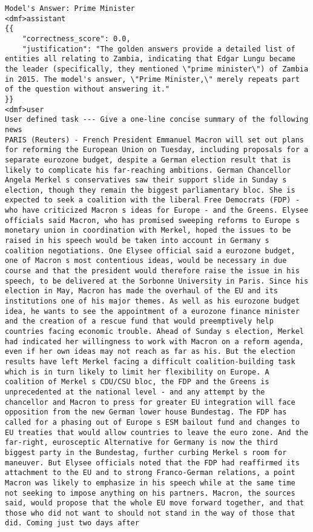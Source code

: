 \begin{tcolorbox}[
    title=Prompt format for the Llama 3.1 70b evaluator instruct LLM, label=prompt format, breakable, colback=gray!10, colframe=gray!50
]
\begin{verbatim}
Model's Answer: Prime Minister
<dmf>assistant
{{
    "correctness_score": 0.0,
    "justification": "The golden answers provide a detailed list of entities all relating to Zambia, indicating that Edgar Lungu became the leader (specifically, they mentioned \"prime minister\") of Zambia in 2015. The model's answer, \"Prime Minister,\" merely repeats part of the question without answering it."
}}
<dmf>user
User defined task --- Give a one-line concise summary of the following news
PARIS (Reuters) - French President Emmanuel Macron will set out plans for reforming the European Union on Tuesday, including proposals for a separate eurozone budget, despite a German election result that is likely to complicate his far-reaching ambitions. German Chancellor Angela Merkel s conservatives saw their support slide in Sunday s election, though they remain the biggest parliamentary bloc. She is expected to seek a coalition with the liberal Free Democrats (FDP) - who have criticized Macron s ideas for Europe - and the Greens. Elysee officials said Macron, who has promised sweeping reforms to Europe s monetary union in coordination with Merkel, hoped the issues to be raised in his speech would be taken into account in Germany s coalition negotiations. One Elysee official said a eurozone budget, one of Macron s most contentious ideas, would be necessary in due course and that the president would therefore raise the issue in his speech, to be delivered at the Sorbonne University in Paris. Since his election in May, Macron has made the overhaul of the EU and its institutions one of his major themes. As well as his eurozone budget idea, he wants to see the appointment of a eurozone finance minister and the creation of a rescue fund that would preemptively help countries facing economic trouble. Ahead of Sunday s election, Merkel had indicated her willingness to work with Macron on a reform agenda, even if her own ideas may not reach as far as his. But the election results have left Merkel facing a difficult coalition-building task which is in turn likely to limit her flexibility on Europe. A coalition of Merkel s CDU/CSU bloc, the FDP and the Greens is unprecedented at the national level - and any attempt by the chancellor and Macron to press for greater EU integration will face opposition from the new German lower house Bundestag. The FDP has called for a phasing out of Europe s ESM bailout fund and changes to EU treaties that would allow countries to leave the euro zone. And the far-right, eurosceptic Alternative for Germany is now the third biggest party in the Bundestag, further curbing Merkel s room for maneuver. But Elysee officials noted that the FDP had reaffirmed its attachment to the EU and to strong Franco-German relations, a point Macron was likely to emphasize in his speech while at the same time not seeking to impose anything on his partners. Macron, the sources said, would propose that the whole EU move forward together, and that those who did not want to should not stand in the way of those that did. Coming just two days after 
\end{verbatim}
\end{tcolorbox}
